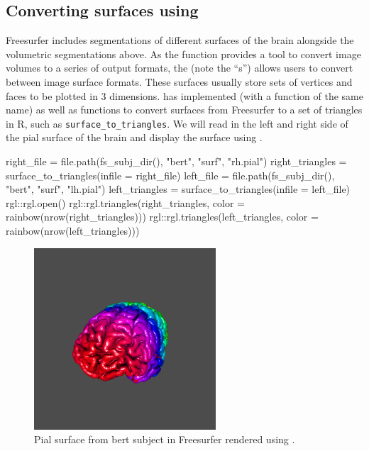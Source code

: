 \subsection{\texorpdfstring{Converting surfaces using
}{Converting surfaces using }}\label{converting-surfaces-using}

Freesurfer includes segmentations of different surfaces of the brain
alongside the volumetric segmentations above. As the 
function provides a tool to convert image volumes to a series of output
formats, the  (note the ``s'') allows users to
convert between image surface formats. These surfaces usually store sets
of vertices and faces to be plotted in 3 dimensions. 
has implemented  (with a function of the same name)
as well as functions to convert surfaces from Freesurfer to a set of
triangles in R, such as \texttt{surface\_to\_triangles}. We will read in
the left and right side of the pial surface of the brain and display the
surface using  \citep{rgl}.

\begin{Schunk}
\begin{Sinput}
right_file = file.path(fs_subj_dir(), 
                   "bert", "surf", "rh.pial")
right_triangles = surface_to_triangles(infile = right_file)
left_file = file.path(fs_subj_dir(), 
                   "bert", "surf", "lh.pial")
left_triangles = surface_to_triangles(infile = left_file) 
rgl::rgl.open()
rgl::rgl.triangles(right_triangles, 
                   color = rainbow(nrow(right_triangles)))
rgl::rgl.triangles(left_triangles, 
                   color = rainbow(nrow(left_triangles)))
\end{Sinput}
\end{Schunk}

\begin{figure}
\centering
\includegraphics{Freesurfer_files/figure-latex/rgl_plot_out.png}
\caption{Pial surface from bert subject in Freesurfer rendered using
.}
\end{figure}

